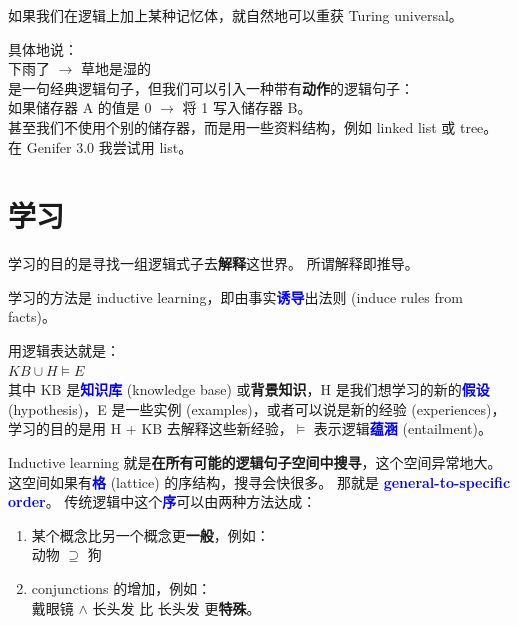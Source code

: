 \documentclass[12pt]{article}
\newcommand{\concept}[1]{\textbf{\textcolor{blue}{#1}}}
\newcommand{\formula}[1]{\textcolor{LogicColor}{#1}}
\newcommand{\tab}{\hspace*{1cm}}
\begin{document}
如果我们在逻辑上加上某种记忆体，就自然地可以重获 Turing universal。 

具体地说：\\
\tab \formula{下雨了 $\rightarrow$ 草地是湿的}\\
是一句经典逻辑句子，但我们可以引入一种带有\textbf{动作}的逻辑句子：\\
\tab \formula{如果储存器 A 的值是 0 $\rightarrow$ 将 1 写入储存器 B}。\\
甚至我们不使用个别的储存器，而是用一些资料结构，例如 linked list 或 tree。 在 Genifer 3.0 我尝试用 list。

\section{学习}

学习的目的是寻找一组逻辑式子去\textbf{解释}这世界。  所谓解释即推导。

学习的方法是 inductive learning，即由事实\concept{诱导}出法则 (induce rules from facts)。

用逻辑表达就是：\\
\tab $KB \cup H \models E$\\
其中 KB 是\concept{知识库} (knowledge base) 或\textbf{背景知识}，H 是我们想学习的新的\concept{假设} (hypothesis)，E 是一些实例 (examples)，或者可以说是新的经验 (experiences)，学习的目的是用 H + KB 去解释这些新经验，$\models$ 表示逻辑\concept{蕴涵} (entailment)。

Inductive learning 就是\textbf{在所有可能的逻辑句子空间中搜寻}，这个空间异常地大。 这空间如果有\concept{格} (lattice) 的序结构，搜寻会快很多。  那就是 \concept{general-to-specific order}。  传统逻辑中这个\concept{序}可以由两种方法达成：
\begin{enumerate}
\item 某个概念比另一个概念更\textbf{一般}，例如：\\
\tab \formula{ 动物 $\supseteq$ 狗 }
\item conjunctions 的增加，例如：\\
\tab \formula{ 戴眼镜 $\wedge$ 长头发 } 比 \formula{长头发} 更\textbf{特殊}。
\end{enumerate}
\end{document}
